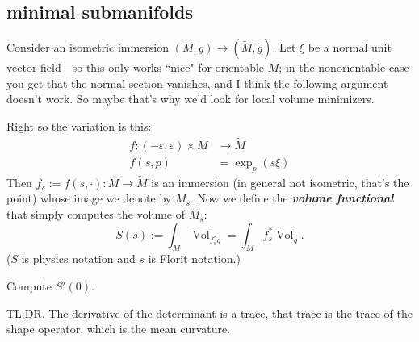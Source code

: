\subsection{minimal submanifolds}

Consider an isometric immersion \((M,g) \to(\tilde{M},\tilde{g})\). Let  \(\xi\) be a normal unit vector field---so this only works ``nice" for orientable \(M\); in the nonorientable case you get that the normal section vanishes, and I think the following argument doesn't work. So maybe that's why we'd look for local volume minimizers.

Right so the variation is this:
\begin{align*}
	f: (-\varepsilon,\varepsilon)\times M &\longrightarrow \tilde{M} \\
	f(s,p) &=\operatorname{exp}_{p}(s \xi)
\end{align*}
Then \(f_s:=f(s,\cdot):M \longrightarrow \tilde{M}\) is an immersion (in general not isometric, that's the point) whose image we denote by \(M_s\). Now we define the \textit{\textbf{volume functional}} that simply computes the volume of \(M_s\):
\[S(s):= \int_{M}\operatorname{Vol}_{f_s ^*\tilde{g}}=\int_M f_s^*\operatorname{Vol}_{\tilde{g}}.\]
(\(S\) is physics notation and \(s\) is Florit notation.)

\begin{exercise}\leavevmode
Compute \(S'(0)\).
\end{exercise}
TL;DR. The derivative of the determinant is a trace, that trace is the trace of the shape operator, which is the mean curvature.


